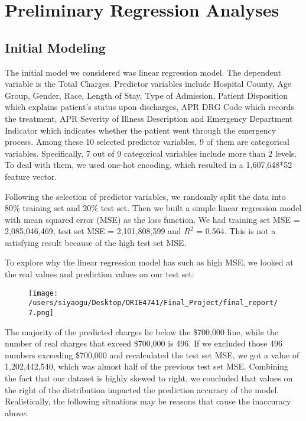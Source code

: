 \documentclass[journal, a4paper,11pt]{IEEEtran}
\begin{document}
\section{Preliminary Regression Analyses}

\subsection{Initial Modeling}
	The initial model we considered was linear regression model. The dependent variable is the Total Charges. Predictor variables include Hospital County, Age Group, Gender, Race, Length of Stay, Type of Admission, Patient Disposition which explains patient's status upon discharges, APR DRG Code which records the treatment, APR Severity of Illness Description and Emergency Department Indicator which indicates whether the patient went through the emergency process. Among these 10 selected predictor variables, 9 of them are categorical variables. Specifically, 7 out of 9 categorical variables include more than 2 levels. To deal with them, we used one-hot encoding, which resulted in a 1,607,648*52 feature vector. 

	Following the selection of predictor variables, we randomly split the data into 80\% training set and 20\% test set. Then we built a simple linear regression model with mean squared error (MSE) as the loss function. We had training set MSE = 2,085,046,469, test set MSE = 2,101,808,599 and $R^2$ = 0.564. This is not a satisfying result because of the high test set MSE.
	
	To explore why the linear regression model has such as high MSE, we looked at the real values and prediction values on our test set:
	
	\begin{figure}[ht]
	\centering
	\texttt{[image: /users/siyaogu/Desktop/ORIE4741/Final\_Project/final\_report/7.png]}
	\end{figure}

	The majority of the predicted charges lie below the \$700,000 line, while the number of real charges that exceed \$700,000 is 496. If we excluded those 496 numbers exceeding \$700,000 and recalculated the test set MSE, we got a value of 1,202,442,540, which was almost half of the previous test set MSE. Combining the fact that our dataset is highly skewed to right, we concluded that values on the right of the distribution impacted the prediction accuracy of the model. Realistically, the following situations may be reasons that cause the inaccuracy above:
	
\end{document}
